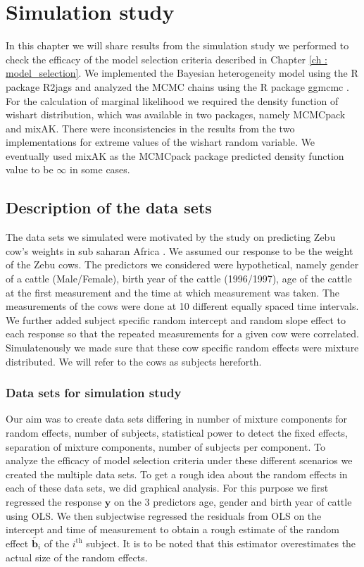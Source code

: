 
\chapter{Simulation study}
\label{ch : simulation_study}

In this chapter we will share results from the simulation study we performed to check the efficacy of the model selection criteria described in Chapter \ref{ch : model_selection}. We implemented the Bayesian heterogeneity model using the R package R2jags \citep{su_r2jags:_2015} and analyzed the MCMC chains using the R package ggmcmc \citep{marin_ggmcmc:_2016}. For the calculation of marginal likelihood we required the density function of wishart distribution, which was available in two packages, namely MCMCpack and mixAK. There were inconsistencies in the results from the two implementations for extreme values of the wishart random variable. We eventually used mixAK \citep{komarek_mixak:_2015} as the MCMCpack package predicted density function value to be $\infty$ in some cases.

\section{Description of the data sets}
The data sets we simulated were motivated by the study on predicting Zebu cow's weights in sub saharan Africa \citep{lesosky_live_2012}. We assumed our response to be the weight of the Zebu cows. The predictors we considered were hypothetical, namely gender of a cattle (Male/Female), birth year of the cattle (1996/1997), age of the cattle at the first measurement and the time at which measurement was taken. The measurements of the cows were done at 10 different equally spaced time intervals. We further added subject specific random intercept and random slope effect to each response so that the repeated measurements for a given cow were correlated. Simulatenously we made sure that these cow specific random effects were mixture distributed. We will refer to the cows as subjects hereforth.

\subsection{Data sets for simulation study}
Our aim was to create data sets differing in number of mixture components for random effects, number of subjects, statistical power to detect the fixed effects, separation of mixture components, number of subjects per component. To analyze the efficacy of model selection criteria under these different scenarios we created the multiple data sets. To get a rough idea about the random effects in each of these data sets, we did graphical analysis. For this purpose we first regressed the response $\boldsymbol{y}$ on the 3 predictors age, gender and birth year of cattle using OLS. We then subjectwise regressed the residuals from OLS on the intercept and time of measurement to obtain a rough estimate of the random effect $\tilde{\boldsymbol{b}_i}$ of the $i^\text{th}$ subject. It is to be noted that this estimator overestimates the actual size of the random effects.

